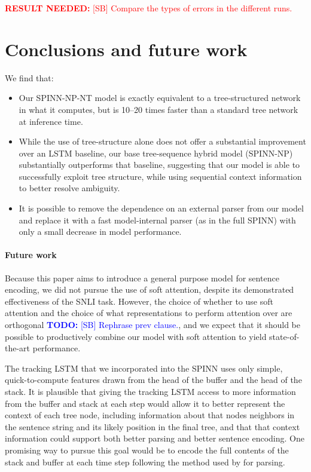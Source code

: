 \documentclass[11pt]{article}
\newcommand\todo[1]{\textcolor{blue}{\textbf{TODO:} #1}}
\newcommand\result[1]{\textcolor{red}{\textbf{RESULT NEEDED:} #1}}
\begin{document}
\result{[SB] Compare the types of errors in the different runs.}

\vspace{10em}

\section{Conclusions and future work}

We find that:
\begin{itemize}
\item Our SPINN-NP-NT model is exactly equivalent to a tree-structured network in what it computes, but is 10--20 times faster than a standard tree network at inference time.
\item While the use of tree-structure alone does not offer a substantial improvement over an LSTM baseline, our base tree-sequence hybrid model (SPINN-NP) substantially outperforms that baseline, suggesting that our model is able to successfully exploit tree structure, while using sequential context information to better resolve ambiguity.
\item It is possible to remove the dependence on an external parser from our model and replace it with a fast model-internal parser (as in the full SPINN) with only a small decrease in model performance.
\end{itemize}

\paragraph{Future work} Because this paper aims to introduce a general purpose model for sentence encoding, we did not pursue the use of soft attention, despite its demonstrated effectiveness of the SNLI task. However, the choice of whether to use soft attention and the choice of what representations to perform attention over are orthogonal \todo{[SB] Rephrase prev clause.}, and we expect that it should be possible to productively combine our model with soft attention to yield state-of-the-art performance.

The tracking LSTM that we incorporated into the SPINN uses only simple, quick-to-compute features drawn from the head of the buffer and the head of the stack. It is plausible that giving the tracking LSTM access to more information from the buffer and stack at each step would allow it to better represent the context of each tree node, including information about that nodes neighbors in the sentence string and its likely position in the final tree, and that that context information could support both better parsing and better sentence encoding. One promising way to pursue this goal would be to encode the full contents of the stack and buffer at each time step following the method used by \citet{dyer-EtAl:2015:ACL-IJCNLP} for parsing.
\end{document}
